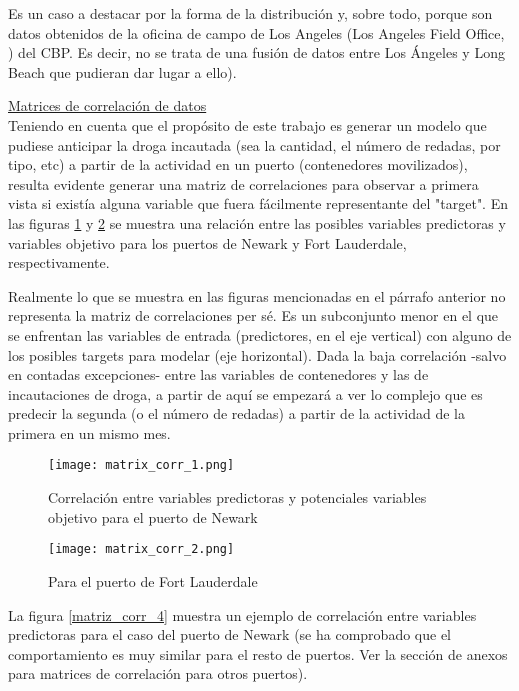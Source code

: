 \documentclass[12pt]{article}
\begin{document}
		Es un caso a destacar por la forma de la distribución y, sobre todo, porque son datos obtenidos de la oficina de campo de Los Angeles (Los Angeles Field Office, \cite{cbp_la_field_office}) del CBP. Es decir, no se trata de una fusión de datos entre Los Ángeles y Long Beach que pudieran dar lugar a ello).
		
		
		\underline{Matrices de correlación de datos}\\
		Teniendo en cuenta que el propósito de este trabajo es generar un modelo que pudiese anticipar la droga incautada (sea la cantidad, el número de redadas, por tipo, etc) a partir de la actividad en un puerto (contenedores movilizados), resulta evidente generar una matriz de correlaciones para observar a primera vista si existía alguna variable que fuera fácilmente representante del "target". En las figuras \ref{matriz_corr_1} y \ref{matriz_corr_2} se muestra una relación entre las posibles variables predictoras y variables objetivo para los puertos de Newark y Fort Lauderdale, respectivamente.
		
		Realmente lo que se muestra en las figuras mencionadas en el párrafo anterior no representa la matriz de correlaciones per sé. Es un subconjunto menor en el que se enfrentan las variables de entrada (predictores, en el eje vertical) con alguno de los posibles targets para modelar (eje horizontal). Dada la baja correlación -salvo en contadas excepciones- entre las variables de contenedores y las de incautaciones de droga, a partir de aquí se empezará a ver lo complejo que es predecir la segunda (o el número de redadas) a partir de la actividad de la primera en un mismo mes. 
		
		\begin{figure}[H]
			\caption{\label{matriz_corr_1} Correlación entre variables predictoras y potenciales variables objetivo para el puerto de Newark}
			\centering
			\hspace*{1cm}
			\texttt{[image: matrix\_corr\_1.png]}
		\end{figure}
	
		\begin{figure}[H]
			\caption{\label{matriz_corr_2} Para el puerto de Fort Lauderdale}
			\centering
			\hspace*{1cm}
			\texttt{[image: matrix\_corr\_2.png]}
		\end{figure}
		
		La figura \ref{matriz_corr_4} muestra un ejemplo de correlación entre variables predictoras para el caso del puerto de Newark (se ha comprobado que el comportamiento es muy similar para el resto de puertos. Ver la sección de anexos para matrices de correlación para otros puertos).
		
\end{document}
